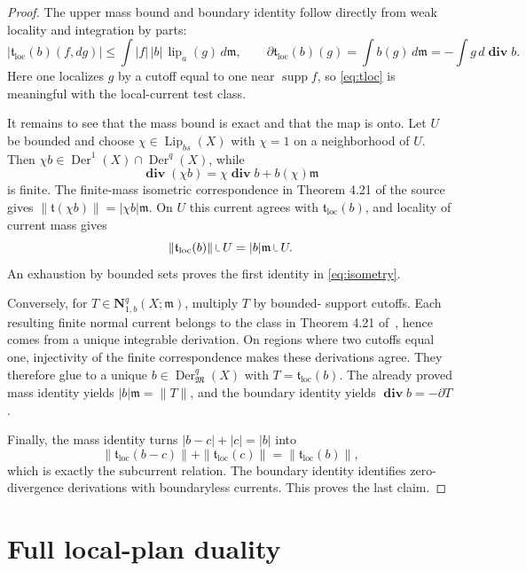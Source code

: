 \documentclass[11pt]{article}
\newcommand{\X}{X}
\newcommand{\m}{\mathfrak m}
\newcommand{\Lip}{\operatorname{Lip}}
\newcommand{\Der}{\operatorname{Der}}
\newcommand{\diver}{\boldsymbol{\operatorname{div}}}
\newcommand{\supp}{\operatorname{supp}}
\begin{document}
\begin{proof}
The upper mass bound and boundary identity follow directly from weak locality
and integration by parts:
\[
 |\mathfrak t_{\mathrm{loc}}(b)(f,dg)|
 \leq\int |f|\,|b|\,\operatorname{lip}_a(g)\,d\m,
 \qquad
 \partial\mathfrak t_{\mathrm{loc}}(b)(g)
 =\int b(g)\,d\m=-\int g\,d\diver b.
\]
Here one localizes $g$ by a cutoff equal to one near $\supp f$, so
\eqref{eq:tloc} is meaningful with the local-current test class.

It remains to see that the mass bound is exact and that the map is onto.  Let
$U$ be bounded and choose $\chi\in\Lip_{bs}(\X)$ with $\chi=1$ on a
neighborhood of $U$.  Then $\chi b\in\Der^1(\X)\cap\Der^q(\X)$, while
\[
 \diver(\chi b)=\chi\diver b+b(\chi)\m
\]
is finite.  The finite-mass isometric correspondence in Theorem 4.21 of the
source~\cite{AIKP} gives
$\|\mathfrak t(\chi b)\|=|\chi b|\m$.  On $U$ this current agrees with
$\mathfrak t_{\mathrm{loc}}(b)$, and locality of current mass gives
\[
 \|\mathfrak t_{\mathrm{loc}}(b)\|\mathbin{\vrule height 1.4ex depth -0.2ex
 width .08ex\vrule height .08ex depth 0ex width .7ex}U
 =|b|\m\mathbin{\vrule height 1.4ex depth -0.2ex width .08ex
 \vrule height .08ex depth 0ex width .7ex}U.
\]
An exhaustion by bounded sets proves the first identity in
\eqref{eq:isometry}.

Conversely, for $T\in\mathbf N^q_{1,b}(\X;\m)$, multiply $T$ by bounded-
support cutoffs.  Each resulting finite normal current belongs to the class in
Theorem 4.21 of~\cite{AIKP}, hence comes from a unique integrable derivation.
On regions where two cutoffs equal one, injectivity of the finite
correspondence makes these derivations agree.  They therefore glue to a unique
$b\in\Der^q_{\mathfrak M}(\X)$ with $T=\mathfrak t_{\mathrm{loc}}(b)$.
The already proved mass identity yields $|b|\m=\|T\|$, and the boundary
identity yields $\diver b=-\partial T$.

Finally, the mass identity turns
$|b-c|+|c|=|b|$ into
\[
 \|\mathfrak t_{\mathrm{loc}}(b-c)\|
 +\|\mathfrak t_{\mathrm{loc}}(c)\|
 =\|\mathfrak t_{\mathrm{loc}}(b)\|,
\]
which is exactly the subcurrent relation.  The boundary identity identifies
zero-divergence derivations with boundaryless currents.  This proves the last
claim.
\end{proof}

\section{Full local-plan duality}
\end{document}
